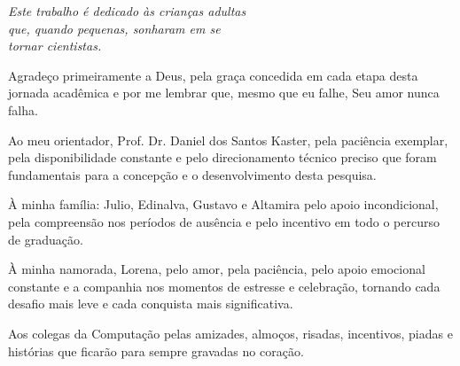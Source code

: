 \documentclass[
	12pt,				%
	openright,			%
	oneside,			%
	a4paper,			%
	tccpreliminar,		%
	]{ABNT-DC-UEL}
\begin{document}
\frenchspacing 


\imprimircapa

\imprimirfolhaderosto*

%     


\begin{dedicatoria}
  \vspace*{\fill}
  \hspace{.4\textwidth}
  \begin{minipage}{.5\textwidth}
    \begin{flushright}
      \textit{Este trabalho é dedicado às crianças adultas\\
      que, quando pequenas, sonharam em se\\
      tornar cientistas.}
    \end{flushright}  
  \end{minipage}
\end{dedicatoria}

\begin{agradecimentos}
Agradeço primeiramente a Deus, pela graça concedida em cada etapa desta jornada acadêmica e por me lembrar que, mesmo que eu falhe, Seu amor nunca falha.

Ao meu orientador, Prof. Dr. Daniel dos Santos Kaster, pela paciência exemplar, pela disponibilidade constante e pelo direcionamento técnico preciso que foram fundamentais para a concepção e o desenvolvimento desta pesquisa.

À minha família: Julio, Edinalva, Gustavo e Altamira pelo apoio incondicional, pela compreensão nos períodos de ausência e pelo incentivo em todo o percurso de graduação.

À minha namorada, Lorena, pelo amor, pela paciência, pelo apoio emocional constante e a companhia nos momentos de estresse e celebração, tornando cada desafio mais leve e cada conquista mais significativa.

Aos colegas da Computação pelas amizades, almoços, risadas, incentivos, piadas e histórias que ficarão para sempre gravadas no coração.

\end{agradecimentos}
\end{document}
